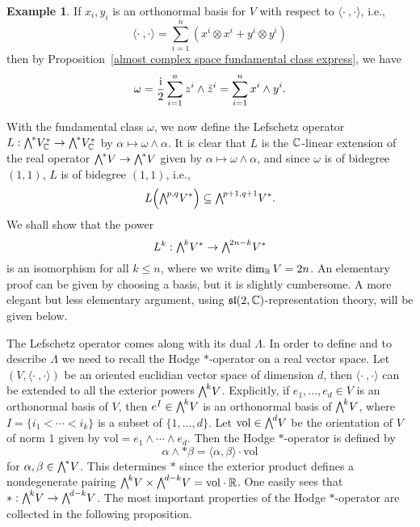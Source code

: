\documentclass[11pt]{book}
\theoremstyle{definition}
\newtheorem{example}[theorem]{Example}
\begin{document}
\begin{example}
If $x_i,y_i$ is an orthonormal basis for $V$ with respect to $\langle\cdot\ ,\cdot\rangle$, i.e.,
\[\langle\cdot\ ,\cdot\rangle=\sum_{i=1}^{n}(x^i\otimes x^i+y^i\otimes y^i)\]
then by Proposition~\ref{almost complex space fundamental class express}, we have
\[\omega=\frac{\mathrm{i}}{2}\sum_{i=1}^{n}z^i\wedge\bar{z}^i=\sum_{i=1}^{n}x^i\wedge y^i.\]
\end{example}
With the fundamental class $\omega$, we now define the Lefschetz operator $L:\bigw^*V^*_{\C}\to\bigw^*V^*_{\C}$ by $\alpha\mapsto\omega\wedge\alpha$. It is clear that $L$ is the $\mathbb{C}$-linear extension of the real operator $\bigw^*V\to\bigw^*V$ given by $\alpha\mapsto\omega\wedge\alpha$, and since $\omega$ is of bidegree $(1,1)$, $L$ is of bidegree $(1,1)$, i.e.,
\[L\Big(\bigw^{p,q}V^*\Big)\sub\bigw^{p+1,q+1}V^*.\]
We shall show that the power
\[L^k:\bigw^kV^*\to\bigw^{2n-k}V^*\]
is an isomorphism for all $k\leq n$, where we write $\dim_{\mathbb{R}}V=2n$. An elementary proof can be given by choosing a basis, but it is slightly cumbersome. A more elegant but less elementary argument, using $\mathfrak{sl}(2,\mathbb{C})$-representation theory, will be given below.\par
The Lefschetz operator comes along with its dual $\Lambda$. In order to define and to describe $\Lambda$ we need to recall the Hodge $\ast$-operator on a real vector space. Let $(V,\langle\cdot\ ,\cdot\rangle)$ be an oriented euclidian vector space of dimension $d$, then $\langle\cdot\ ,\cdot\rangle$ can be extended to all the exterior powers $\bigw^kV$. Explicitly, if $e_1,\dots,e_d\in V$ is an orthonormal basis of $V$, then $e^I\in\bigw^kV$ is an orthonormal basis of $\bigw^kV$, where $I=\{i_1<\cdots<i_k\}$ is a subset of $\{1,\dots,d\}$. Let $\mathrm{vol}\in\bigw^dV$ be the orientation of $V$ of norm $1$ given by $\mathrm{vol}=e_1\wedge\cdots\wedge e_d$. Then the Hodge $\ast$-operator is defined by
\[\alpha\wedge\ast\beta=\langle\alpha,\beta\rangle\cdot\mathrm{vol}\]
for $\alpha,\beta\in\bigw^*V$. This determines $\ast$ since the exterior product defines a nondegenerate pairing $\bigw^kV\times\bigw^{d-k}V=\mathrm{vol}\cdot\R$. One easily sees that $\ast:\bigw^kV\to\bigw^{d-k}V$. The most important properties of the Hodge $\ast$-operator are collected in the following proposition.
\end{document}
